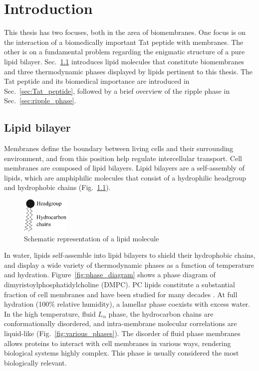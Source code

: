 \chapter{Introduction}
This thesis has two focuses, both in the area of biomembranes.
One focus is on the interaction of a biomedically important Tat peptide with 
membranes.
The other is on a fundamental problem regarding the enigmatic structure of a
pure lipid bilayer.
Sec.~\ref{sec:lipid_bilayer} introduces lipid molecules that constitute
biomembranes and three thermodynamic phases displayed by lipids pertinent to this 
thesis.
The Tat peptide and its biomedical importance are introduced in Sec.~\ref{sec:Tat_peptide},
followed by a brief overview of the ripple phase in Sec.~\ref{sec:ripple_phase}.


\section{Lipid bilayer}\label{sec:lipid_bilayer}
Membranes define the boundary between living cells
and their surrounding environment, and from this position help 
regulate intercellular transport. Cell membranes are composed of lipid bilayers.
Lipid bilayers are a self-assembly of lipids, which are 
amphiphilic molecules that consist of a hydrophilic headgroup
and hydrophobic chains (Fig.~\ref{fig:lipid}).

\begin{figure}
  \centering
  \includegraphics[width=0.2\textwidth]{figures/lipid}
  \caption{Schematic representation of a lipid molecule}
  \label{fig:lipid}
\end{figure}

In water, lipids self-assemble into lipid bilayers to shield their hydrophobic 
chains, and display a wide variety of thermodynamic phases
as a function of temperature and hydration. Figure~\ref{fig:phase_diagram}
shows a phase diagram of dimyristoylphosphatidylcholine (DMPC).
PC lipids constitute a substantial fraction of cell membranes
and have been studied for many decades \cite{Nagle00}.
At full hydration (100\% relative humidity), a lamellar phase coexists with excess water.
In the high temperature, fluid $L_\alpha$ phase, the hydrocarbon chains 
are conformationally disordered, and intra-membrane molecular correlations 
are liquid-like \cite{ref:Fahey78} (Fig.~\ref{fig:various_phases}).
The disorder of fluid phase membranes allows proteins to 
interact with cell membranes in various ways, rendering biological systems
highly complex. 
This phase is usually considered the most biologically relevant.

